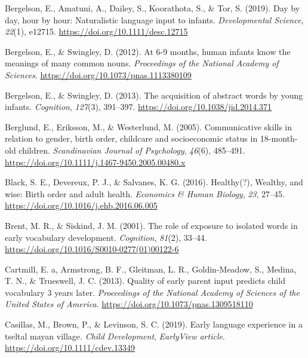 \documentclass[
  english,
  man,floatsintext]{apa6}
\begin{document}
\leavevmode\hypertarget{ref-bergelson_day_2019}{}%
Bergelson, E., Amatuni, A., Dailey, S., Koorathota, S., \& Tor, S. (2019). Day by day, hour by hour: Naturalistic language input to infants. \emph{Developmental Science}, \emph{22}(1), e12715. \url{https://doi.org/10.1111/desc.12715}

\leavevmode\hypertarget{ref-bergelson_at_2012}{}%
Bergelson, E., \& Swingley, D. (2012). At 6-9 months, human infants know the meanings of many common nouns. \emph{Proceedings of the National Academy of Sciences}. \url{https://doi.org/10.1073/pnas.1113380109}

\leavevmode\hypertarget{ref-bergelson_acquisition_2013}{}%
Bergelson, E., \& Swingley, D. (2013). The acquisition of abstract words by young infants. \emph{Cognition}, \emph{127}(3), 391--397. \url{https://doi.org/10.1038/jid.2014.371}

\leavevmode\hypertarget{ref-berglund_communicative_2005}{}%
Berglund, E., Eriksson, M., \& Westerlund, M. (2005). Communicative skills in relation to gender, birth order, childcare and socioeconomic status in 18-month-old children. \emph{Scandinavian Journal of Psychology}, \emph{46}(6), 485--491. \url{https://doi.org/10.1111/j.1467-9450.2005.00480.x}

\leavevmode\hypertarget{ref-black_healthy_2016}{}%
Black, S. E., Devereux, P. J., \& Salvanes, K. G. (2016). Healthy(?), Wealthy, and wise: Birth order and adult health. \emph{Economics \& Human Biology}, \emph{23}, 27--45. \url{https://doi.org/10.1016/j.ehb.2016.06.005}

\leavevmode\hypertarget{ref-brent_role_2001}{}%
Brent, M. R., \& Siskind, J. M. (2001). The role of exposure to isolated words in early vocabulary development. \emph{Cognition}, \emph{81}(2), 33--44. \url{https://doi.org/10.1016/S0010-0277(01)00122-6}

\leavevmode\hypertarget{ref-cartmill_quality_2013}{}%
Cartmill, E. a, Armstrong, B. F., Gleitman, L. R., Goldin-Meadow, S., Medina, T. N., \& Trueswell, J. C. (2013). Quality of early parent input predicts child vocabulary 3 years later. \emph{Proceedings of the National Academy of Sciences of the United States of America}. \url{https://doi.org/10.1073/pnas.1309518110}

\leavevmode\hypertarget{ref-casillas_early_2019}{}%
Casillas, M., Brown, P., \& Levinson, S. C. (2019). Early language experience in a tseltal mayan village. \emph{Child Development}, \emph{EarlyView article}. \url{https://doi.org/10.1111/cdev.13349}
\end{document}
